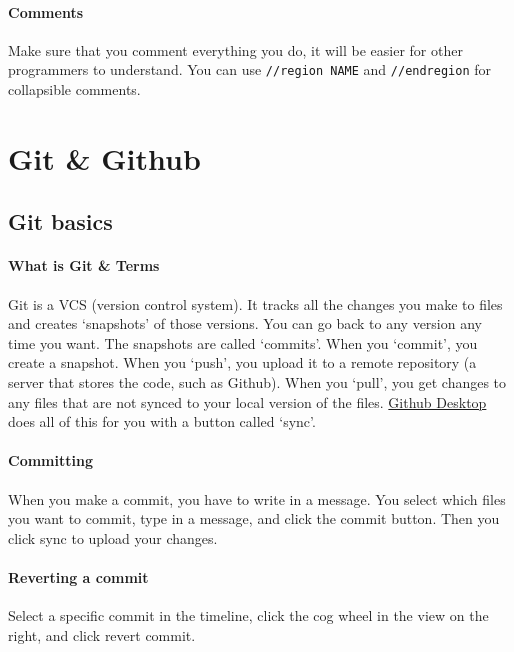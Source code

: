 \documentclass[12p,a4papert]{article}
\begin{document}
\paragraph{Comments} Make sure that you comment everything you do, it will be easier for other programmers to understand. You can use \verb!//region NAME! and \verb!//endregion! for collapsible comments.

\section{Git \& Github}
\subsection{Git basics}
\paragraph{What is Git \& Terms} Git is a VCS (version control system). It tracks all the changes you make to files and creates `snapshots' of those versions. You can go back to any version any time you want. The snapshots are called `commits'. When you `commit', you create a snapshot. When you `push', you upload it to a remote repository (a server that stores the code, such as Github). When you `pull', you get changes to any files that are not synced to your local version of the files. \href{https://desktop.github.com}{Github Desktop} does all of this for you with a button called `sync'. 

\paragraph{Committing} When you make a commit, you have to write in a message. You select which files you want to commit, type in a message, and click the commit button. Then you click sync to upload your changes.

\paragraph{Reverting a commit} Select a specific commit in the timeline, click the cog wheel in the view on the right, and click revert commit.
\end{document}
